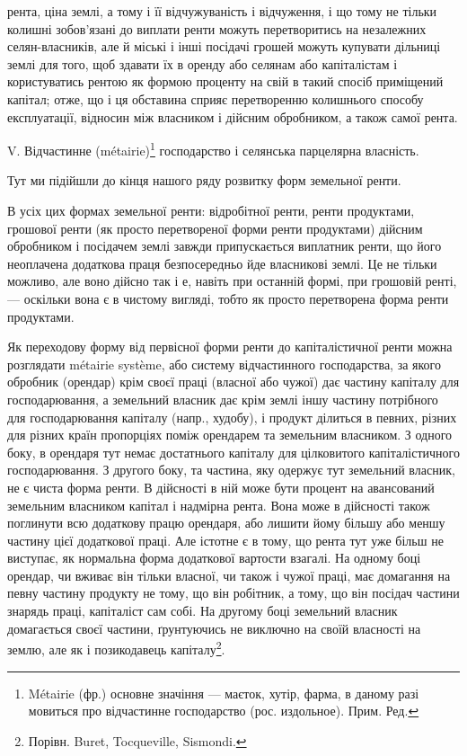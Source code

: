 рента, ціна землі, а тому і її відчужуваність і відчуження, і що тому не тільки
колишні зобов’язані до виплати ренти можуть перетворитись на незалежних
селян-власників, але й міські і інші посідачі грошей можуть купувати дільниці
землі для того, щоб здавати їх в оренду або селянам або капіталістам
і користуватись рентою як формою проценту на свій в такий спосіб приміщений
капітал; отже, що і ця обставина сприяє перетворенню колишнього способу
експлуатації, відносин між власником і дійсним обробником, а також самої рента.

V. Відчастинне (métairie)\footnote*{
Métairie (фр.) основне значіння — маєток, хутір, фарма, в даному разі мовиться про відчастинне
господарство (рос. издольное). Прим. Ред.
} господарство і селянська парцелярна
власність.

Тут ми підійшли до кінця нашого ряду розвитку форм земельної ренти.

В усіх цих формах земельної ренти: відробітної ренти, ренти продуктами,
грошової ренти (як просто перетвореної форми ренти продуктами) дійсним
обробником і посідачем землі завжди припускається виплатник ренти, що його
неоплачена додаткова праця безпосередньо йде власникові землі. Це не тільки
можливо, але воно дійсно так і е, навіть при останній формі, при грошовій
ренті, — оскільки вона є в чистому вигляді, тобто як просто перетворена форма
ренти продуктами.

Як переходову форму від первісної форми ренти до капіталістичної ренти
можна розглядати métairie système, або систему відчастинного господарства, за якого
обробник (орендар) крім своєї праці (власної або чужої) дає частину капіталу
для господарювання, а земельний власник дає крім землі іншу частину потрібного
для господарювання капіталу (напр., худобу), і продукт ділиться в певних,
різних для різних країн пропорціях поміж орендарем та земельним власником.
З одного боку, в орендаря тут немає достатнього капіталу для цілковитого капіталістичного
господарювання. З другого боку, та частина, яку одержує тут
земельний власник, не є чиста форма ренти. В дійсності в ній може бути процент
на авансований земельним власником капітал і надмірна рента. Вона може
в дійсності також поглинути всю додаткову працю орендаря, або лишити йому
більшу або меншу частину цієї додаткової праці. Але істотне є в тому, що
рента тут уже більш не виступає, як нормальна форма додаткової вартости взагалі.
На одному боці орендар, чи вживає він тільки власної, чи також і чужої праці,
має домагання на певну частину продукту не тому, що він робітник, а тому,
що він посідач частини знарядь праці, капіталіст сам собі. На другому боці
земельний власник домагається своєї частини, ґрунтуючись не виключно на
своїй власності на землю, але як і позикодавець капіталу\footnote{
Порівн. Buret, Tocqueville, Sismondi.
}.

